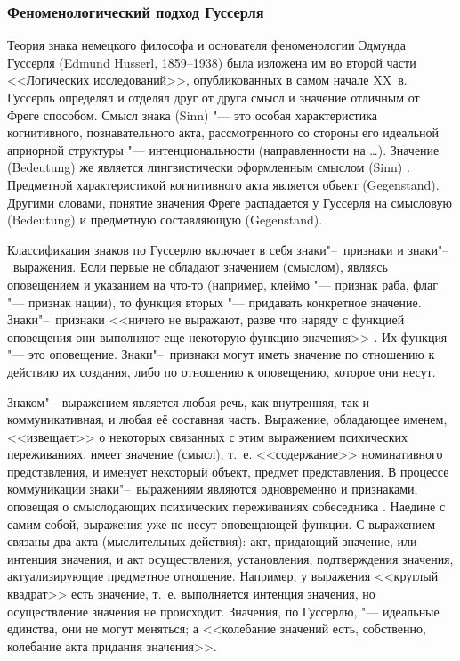 \documentclass[a4paper,12pt]{article}
\begin{document}
	\subsubsection{Феноменологический подход Гуссерля}
	
	 Теория знака немецкого философа и основателя феноменологии Эдмунда Гуссерля (Edmund Husserl, 1859--1938) была изложена им во второй части <<Логических исследований>>, опубликованных в самом начале XX~в. Гуссерль определял и отделял друг от друга смысл и значение отличным от Фреге способом. Смысл знака (Sinn) "--- это особая характеристика когнитивного, познавательного акта, рассмотренного со стороны его идеальной априорной структуры "--- интенциональности (направленности на \dots). Значение (Bedeutung) же является лингвистически оформленным смыслом (Sinn) \cite{Zaitceva2002}. Предметной характеристикой когнитивного акта является объект (Gegenstand). Другими словами, понятие значения Фреге распадается у Гуссерля на смысловую (Bedeutung) и предметную составляющую (Gegenstand).
	 
	 Классификация знаков по Гуссерлю включает в себя знаки"--~признаки и знаки"--~выражения. Если первые не обладают значением (смыслом), являясь оповещением и указанием на что-то (например, клеймо "--- признак раба, флаг "--- признак нации), то функция вторых "--- придавать конкретное значение. Знаки"--~признаки <<ничего не выражают, разве что наряду с функцией оповещения они выполняют еще некоторую функцию значения>> \cite[35]{Gusserl2001}. Их функция "--- это оповещение. Знаки"--~признаки могут иметь значение по отношению к действию их создания, либо по отношению к оповещению, которое они несут.
	 
	 Знаком"--~выражением является любая речь, как внутренняя, так и коммуникативная, и любая её составная часть. Выражение, обладающее именем, <<извещает>> о некоторых связанных с этим выражением психических переживаниях, имеет значение (смысл), т.~е. <<содержание>> номинативного представления, и именует некоторый объект, предмет представления. В процессе коммуникации знаки"--~выражениям являются одновременно и признаками, оповещая о смыслодающих психических переживаниях собеседника \cite[43]{Gusserl2001}. Наедине с самим собой, выражения уже не несут оповещающей функции. С выражением связаны два акта (мыслительных действия): акт, придающий значение, или интенция значения, и акт осуществления, установления, подтверждения значения, актуализирующие предметное отношение. Например, у выражения <<круглый квадрат>> есть значение, т.~е. выполняется интенция значения, но осуществление значения не происходит. Значения, по Гуссерлю, "--- идеальные единства, они не могут меняться; а <<колебание значений есть, собственно, колебание акта придания значения>>.
	 	
\end{document}
